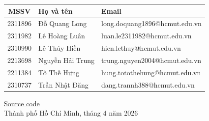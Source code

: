 \documentclass[11pt,a4paper]{article}
\begin{document}
\begin{titlepage}
\begin{center}
\begin{tabular}{|c|l|l|}
\hline
\textbf{MSSV} & \textbf{Họ và tên} & \textbf{Email} \\
\hline
2311896 & Đỗ Quang Long & long.doquang1896@hcmut.edu.vn \\
\hline
2311982 & Lê Hoàng Luân & luan.le2311982@hcmut.edu.vn \\
\hline
2310990 & Lê Thúy Hiền & hien.lethuy@hcmut.edu.vn \\
\hline
2213698 & Nguyễn Hải Trung & trung.nguyen2004@hcmut.edu.vn \\
\hline
2211384 & Tô Thế Hưng & hung.totothehung@hcmut.edu.vn \\
\hline
2310737 & Trần Nhật Đăng & dang.trannh388@hcmut.edu.vn \\
\hline
\end{tabular}
\end{center}
\vspace{0.3cm}
\begin{center}
\href{https://github.com/lehoangluan1/SA_IRMS}{Source code}\\
{\footnotesize Thành phố Hồ Chí Minh, tháng 4 năm 2026}
\end{center}
\end{titlepage}


\vspace{0.5em}
\tableofcontents
\newpage







\end{document}
